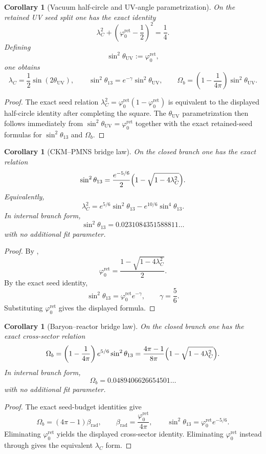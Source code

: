 \documentclass[11pt,a4paper]{article}
\newtheorem{corollary}[theorem]{Corollary}
\theoremstyle{definition}
\theoremstyle{remark}
\newcommand{\phiz}{\varphi_0^{\mathrm{ret}}}
\begin{document}
\begin{corollary}[Vacuum half-circle and UV-angle parametrization]
\label{cor:uv-half-circle}
On the retained UV seed split one has the exact identity
\[
\lambda_C^2+\left(\phiz-\frac12\right)^2=\frac14.
\]
Defining
\[
\sin^2\theta_{\mathrm{UV}}:=\phiz,
\]
one obtains
\[
\lambda_C=\frac12\sin(2\theta_{\mathrm{UV}}),
\qquad
\sin^2\theta_{13}=e^{-\gamma}\sin^2\theta_{\mathrm{UV}},
\qquad
\Omega_b=\left(1-\frac{1}{4\pi}\right)\sin^2\theta_{\mathrm{UV}}.
\]
\end{corollary}

\begin{proof}
The exact seed relation $\lambda_C^2=\phiz(1-\phiz)$ is equivalent to the displayed half-circle
identity after completing the square. The $\theta_{\mathrm{UV}}$ parametrization then follows
immediately from $\sin^2\theta_{\mathrm{UV}}=\phiz$ together with the exact retained-seed formulas
for $\sin^2\theta_{13}$ and $\Omega_b$.
\end{proof}

\begin{corollary}[CKM--PMNS bridge law]
\label{cor:ckm-pmns-bridge-law}
On the closed branch one has the exact relation
\[
\sin^2\theta_{13}
=
\frac{e^{-5/6}}{2}\Bigl(1-\sqrt{1-4\lambda_C^2}\Bigr).
\]
Equivalently,
\[
\lambda_C^2=e^{5/6}\sin^2\theta_{13}-e^{10/6}\sin^4\theta_{13}.
\]
In internal branch form,
\[
\sin^2\theta_{13}=0.0231084351588811\ldots
\]
with no additional fit parameter.
\end{corollary}

\begin{proof}
By ,
\[
\phiz=\frac{1-\sqrt{1-4\lambda_C^2}}{2}.
\]
By the exact seed identity,
\[
\sin^2\theta_{13}=\phiz e^{-\gamma},
\qquad
\gamma=\frac56.
\]
Substituting $\phiz$ gives the displayed formula.
\end{proof}

\begin{corollary}[Baryon--reactor bridge law]
\label{cor:baryon-reactor-bridge-law}
On the closed branch one has the exact cross-sector relation
\[
\Omega_b
=
\left(1-\frac{1}{4\pi}\right)e^{5/6}\sin^2\theta_{13}
=
\frac{4\pi-1}{8\pi}\Bigl(1-\sqrt{1-4\lambda_C^2}\Bigr).
\]
In internal branch form,
\[
\Omega_b=0.0489406626654501\ldots
\]
with no additional fit parameter.
\end{corollary}

\begin{proof}
The exact seed-budget identities give
\[
\Omega_b=(4\pi-1)\beta_{\mathrm{rad}},
\qquad
\beta_{\mathrm{rad}}=\frac{\phiz}{4\pi},
\qquad
\sin^2\theta_{13}=\phiz e^{-5/6}.
\]
Eliminating $\phiz$ yields the displayed cross-sector identity. Eliminating $\phiz$ instead through
 gives the equivalent $\lambda_C$ form.
\end{proof}
\end{document}
